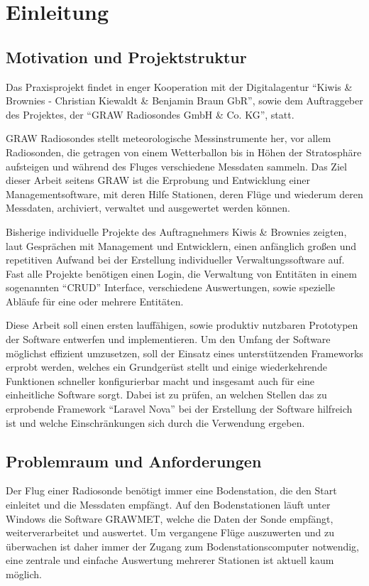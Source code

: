 \newpage


\section{Einleitung}

\subsection{Motivation und Projektstruktur}
Das Praxisprojekt findet in enger Kooperation mit der Digitalagentur \enquote{Kiwis \& Brownies - Christian Kiewaldt \& Benjamin Braun GbR}\cite{kiwis}, sowie dem Auftraggeber des Projektes, der \enquote{GRAW Radiosondes GmbH \& Co. KG}\cite{graw}, statt.

GRAW Radiosondes stellt meteorologische Messinstrumente her, vor allem Radiosonden, die getragen von einem Wetterballon bis in Höhen der Stratosphäre aufsteigen und während des Fluges verschiedene Messdaten sammeln.
Das Ziel dieser Arbeit seitens GRAW ist die Erprobung und Entwicklung einer Managementsoftware, mit deren Hilfe Stationen, deren Flüge und wiederum deren Messdaten, archiviert, verwaltet und ausgewertet werden können.

Bisherige individuelle Projekte des Auftragnehmers Kiwis \& Brownies zeigten, laut Gesprächen mit Management und Entwicklern, einen anfänglich großen und repetitiven Aufwand bei der Erstellung individueller Verwaltungssoftware auf.
Fast alle Projekte benötigen einen Login, die Verwaltung von Entitäten in einem sogenannten \enquote{CRUD}\cite{crud} Interface, verschiedene Auswertungen, sowie spezielle Abläufe für eine oder mehrere Entitäten.

Diese Arbeit soll einen ersten lauffähigen, sowie produktiv nutzbaren Prototypen der Software entwerfen und implementieren.
Um den Umfang der Software möglichst effizient umzusetzen, soll der Einsatz eines unterstützenden Frameworks erprobt werden, welches ein Grundgerüst stellt und einige wiederkehrende Funktionen schneller konfigurierbar macht und insgesamt auch für eine einheitliche Software sorgt.
Dabei ist zu prüfen, an welchen Stellen das zu erprobende Framework \enquote{Laravel Nova}\cite{laravel-nova} bei der Erstellung der Software hilfreich ist und welche Einschränkungen sich durch die Verwendung ergeben.

\subsection{Problemraum und Anforderungen}
Der Flug einer Radiosonde benötigt immer eine Bodenstation, die den Start einleitet und die Messdaten empfängt.
Auf den Bodenstationen läuft unter Windows die Software GRAWMET, welche die Daten der Sonde empfängt, weiterverarbeitet und auswertet.
Um vergangene Flüge auszuwerten und zu überwachen ist daher immer der Zugang zum Bodenstationscomputer notwendig, eine zentrale und einfache Auswertung mehrerer Stationen ist aktuell kaum möglich.


